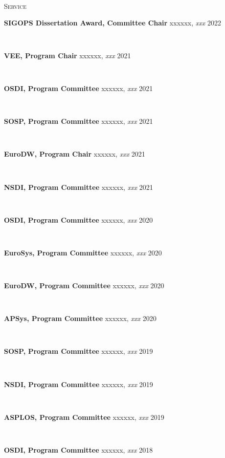 \documentclass[10pt,times]{report}
\newlength{\sectiongap}
\newlength{\entrygap}
\newlength{\sectioncolwidth}
\newlength{\colgap}
\newlength{\stuffwidth}
\def\ifEqString#1#2{\def\testa{#1}\def\testb{#2}%
  \ifx\testa\testb}
\newenvironment{rtable}{
  \begin{minipage}{\textwidth}
  }{
  \end{minipage}
}
\newenvironment{rentry}[3][xxx]{
  \begin{minipage}[t]{\hsize}
    \textbf{#2}\ifEqString{#1}{xxx}\relax\else, \textit{#1}\fi
    \hspace{\stretch{1}} #3 \\
  }{
    \removelastskip
  \end{minipage}
  \\[\entrygap]  %
}
\newenvironment{rsection}[1]{
  \begin{minipage}[t]{\sectioncolwidth}
    \textsc{#1}
  \end{minipage}
  \hspace{\colgap}
  \begin{minipage}[t]{\stuffwidth}
  }{
    \removelastskip
  \end{minipage}
  \\[\sectiongap]
}
\begin{document}
\begin{rtable}
\begin{rsection}{Service}
\begin{rentry}{SIGOPS Dissertation Award, Committee Chair}{2022}
    \end{rentry}
    \begin{rentry}{VEE, Program Chair}{2021}
      \vspace{-0.5em}
    \end{rentry}
    \begin{rentry}{OSDI, Program Committee}{2021}
      \vspace{-0.5em}
    \end{rentry}
    \begin{rentry}{SOSP, Program Committee}{2021}
      \vspace{-0.5em}
    \end{rentry}
    \begin{rentry}{EuroDW, Program Chair}{2021}
      \vspace{-0.5em}
    \end{rentry}
    \begin{rentry}{NSDI, Program Committee}{2021}
      \vspace{-0.5em}
    \end{rentry}
    \begin{rentry}{OSDI, Program Committee}{2020}
      \vspace{-0.5em}
    \end{rentry}
    \begin{rentry}{EuroSys, Program Committee}{2020}
       \vspace{-0.5em}
    \end{rentry}
    \begin{rentry}{EuroDW, Program Committee}{2020}
       \vspace{-0.5em}
    \end{rentry}
    \begin{rentry}{APSys, Program Committee}{2020}
       \vspace{-0.5em}
    \end{rentry}
    \begin{rentry}{SOSP, Program Committee}{2019}
       \vspace{-0.5em}
    \end{rentry}
    \begin{rentry}{NSDI, Program Committee}{2019}
       \vspace{-0.5em}
    \end{rentry}
    \begin{rentry}{ASPLOS, Program Committee}{2019}
       \vspace{-0.5em}
    \end{rentry}
    \begin{rentry}{OSDI, Program Committee}{2018}

\end{rentry}
\end{rsection}
\end{rtable}
\end{document}
